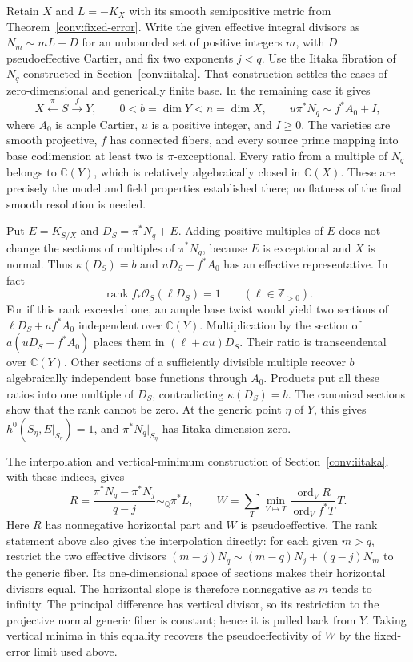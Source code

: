 Retain $X$ and $L=-K_X$ with its smooth semipositive metric from
Theorem~\ref{conv:fixed-error}.  Write the given effective integral
divisors as $N_m\sim mL-D$ for an unbounded set of positive integers
$m$, with $D$ pseudoeffective Cartier, and fix two exponents
$j<q$.  Use the Iitaka fibration of $N_q$ constructed in
Section~\ref{conv:iitaka}.  That construction settles the cases of
zero-dimensional and generically finite base.  In the remaining case
it gives
\[
 X\xleftarrow{\ \pi\ }S\xrightarrow{\ f\ }Y,
 \qquad 0<b=\dim Y<n=\dim X,
 \qquad u\pi^*N_q\sim f^*A_0+I,
\]
where $A_0$ is ample Cartier, $u$ is a positive integer, and $I\ge0$.  The varieties are
smooth projective, $f$ has connected fibers, and every source prime
mapping into base codimension at least two is $\pi$-exceptional.
Every ratio from a multiple of $N_q$ belongs to $\mathbb C(Y)$, which
is relatively algebraically closed in $\mathbb C(X)$.
These are precisely the model and field properties established there;
no flatness of the final smooth resolution is needed.

Put $E=K_{S/X}$ and $D_S=\pi^*N_q+E$.  Adding positive multiples of
$E$ does not change the sections of multiples of $\pi^*N_q$, because
$E$ is exceptional and $X$ is normal.  Thus $\kappa(D_S)=b$ and
$uD_S-f^*A_0$ has an effective representative.  In fact
\begin{equation}\label{jet:all-ranks}
 \operatorname{rank}f_*\mathcal O_S(\ell D_S)=1
 \qquad(\ell\in\mathbb Z_{>0}).
\end{equation}
For if this rank exceeded one, an ample base twist would yield two
sections of $\ell D_S+af^*A_0$ independent over $\mathbb C(Y)$.
Multiplication by the section of $a(uD_S-f^*A_0)$ places them in
$(\ell+au)D_S$.  Their ratio is transcendental over $\mathbb C(Y)$.
Other sections of a sufficiently divisible multiple recover $b$
algebraically independent base functions through $A_0$.  Products put
all these ratios into one multiple of $D_S$, contradicting
$\kappa(D_S)=b$.  The canonical sections show that the rank cannot be
zero.  At the generic point $\eta$ of $Y$, this gives
$h^0(S_\eta,E|_{S_\eta})=1$, and
$\pi^*N_q|_{S_\eta}$ has Iitaka dimension zero.

The interpolation and vertical-minimum construction of
Section~\ref{conv:iitaka}, with these indices, gives
\[
 R=\frac{\pi^*N_q-\pi^*N_j}{q-j}\sim_{\mathbb Q}\pi^*L,
 \qquad
 W=\sum_T\min_{V\mapsto T}
       \frac{\operatorname{ord}_V R}{\operatorname{ord}_V f^*T}\,T.
\]
Here $R$ has nonnegative horizontal part and $W$ is pseudoeffective.
The rank statement above also gives the interpolation directly:
for each given $m>q$, restrict the two effective divisors
$(m-j)N_q\sim(m-q)N_j+(q-j)N_m$ to the generic fiber.  Its
one-dimensional space of sections makes their horizontal divisors
equal.  The horizontal slope is therefore nonnegative as $m$ tends
to infinity.  The principal difference has vertical divisor, so its
restriction to the projective normal generic fiber is constant; hence
it is pulled back from $Y$.  Taking vertical minima in this equality
recovers the pseudoeffectivity of $W$ by the fixed-error limit used
above.


